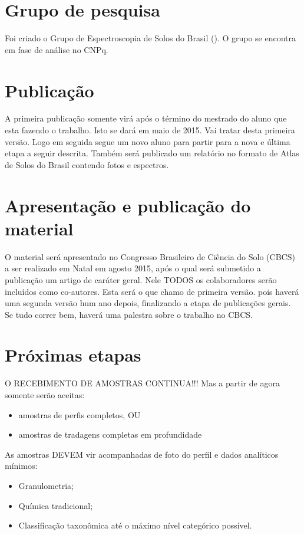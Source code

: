 \section{Grupo de pesquisa}

Foi criado o Grupo de Espectroscopia de Solos do Brasil (\GESB). O grupo se encontra em fase de análise no CNPq.

\section{Publicação}

A primeira publicação somente virá após o término do mestrado do aluno que esta fazendo o trabalho. Isto se dará em maio de 2015. Vai tratar desta primeira versão. Logo em seguida segue um novo aluno para partir para a nova e última etapa a seguir descrita. Também será publicado um relatório no formato de Atlas de Solos do Brasil contendo fotos e espectros.

\section{Apresentação e publicação do material}

O material será apresentado no Congresso Brasileiro de Ciência do Solo (CBCS) a ser realizado em Natal em agosto 2015, após o qual será submetido a publicação um artigo de caráter geral. Nele TODOS os colaboradores serão incluídos como co-autores. Esta será o que chamo de primeira versão. pois haverá uma segunda versão hum ano depois, finalizando a etapa de publicações gerais.
Se tudo correr bem, haverá uma palestra sobre o trabalho no CBCS.

\section{Próximas etapas}

O RECEBIMENTO DE AMOSTRAS CONTINUA!!! Mas a partir de agora somente serão aceitas:

\begin{itemize}
  \item amostras de perfis completos, OU
  \item amostras de tradagens completas em profundidade
\end{itemize}

As amostras DEVEM vir acompanhadas de foto do perfil e dados analíticos mínimos:

\begin{itemize}
  \item Granulometria;
  \item Química tradicional;
  \item Classificação taxonômica até o máximo nível categórico possível.
\end{itemize}

